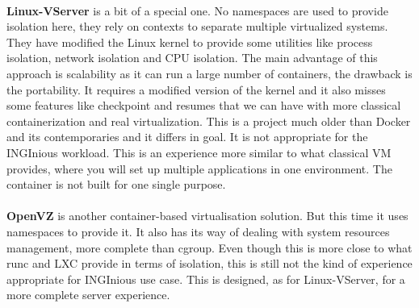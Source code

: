 \paragraph{}\textbf{Linux-VServer}\cite{linux-vserver} is a bit of a special one.  No namespaces are used to provide isolation here, they rely on contexts to separate multiple virtualized systems.  They have modified the Linux kernel to provide some utilities like process isolation, network isolation and CPU isolation.  The main advantage of this approach is scalability as it can run a large number of containers, the drawback is the portability.  It requires a modified version of the kernel and it also misses some features like checkpoint and resumes that we can have with more classical containerization and real virtualization.  This is a project much older than Docker and its contemporaries and it differs in goal.  It is not appropriate for the INGInious workload.  This is an experience more similar to what classical VM provides, where you will set up multiple applications in one environment.  The container is not built for one single purpose.

\paragraph{}\textbf{OpenVZ}\cite{openvz} is another container-based virtualisation solution.  But this time it uses namespaces to provide it.  It also has its way of dealing with system resources management, more complete than cgroup.  Even though this is more close to what runc and LXC provide in terms of isolation, this is still not the kind of experience appropriate for INGInious use case.  This is designed, as for Linux-VServer, for a more complete server experience.

